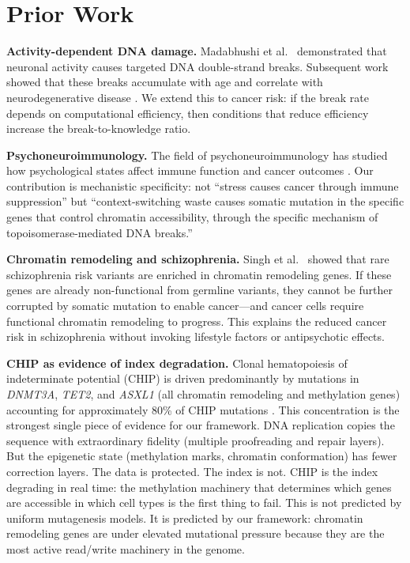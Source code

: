 \documentclass[11pt]{article}
\theoremstyle{definition}
\begin{document}
\section{Prior Work}
\label{sec:prior}

\textbf{Activity-dependent DNA damage.} Madabhushi et al.\
\cite{Madabhushi2015} demonstrated that neuronal activity causes
targeted DNA double-strand breaks. Subsequent work showed that
these breaks accumulate with age and correlate with
neurodegenerative disease \cite{Thadathil2021}. We extend this to
cancer risk: if the break rate depends on computational efficiency,
then conditions that reduce efficiency increase the break-to-knowledge
ratio.

\textbf{Psychoneuroimmunology.} The field of
psychoneuroimmunology has studied how psychological states
affect immune function and cancer outcomes \cite{Kiecolt-Glaser2002}.
Our contribution is mechanistic specificity: not ``stress causes
cancer through immune suppression'' but ``context-switching waste
causes somatic mutation in the specific genes that control chromatin
accessibility, through the specific mechanism of topoisomerase-mediated
DNA breaks.''

\textbf{Chromatin remodeling and schizophrenia.} Singh et al.\
\cite{Singh2016} showed that rare schizophrenia risk variants are
enriched in chromatin remodeling genes. If these genes are already
non-functional from germline variants, they cannot be further
corrupted by somatic mutation to enable cancer---and cancer cells
require functional chromatin remodeling to progress. This explains
the reduced cancer risk in schizophrenia without invoking
lifestyle factors or antipsychotic effects.

\textbf{CHIP as evidence of index degradation.}
Clonal hematopoiesis of indeterminate potential (CHIP) is
driven predominantly by mutations in \emph{DNMT3A}, \emph{TET2},
and \emph{ASXL1} (all chromatin remodeling and methylation genes)
accounting for approximately 80\% of CHIP mutations
\cite{Jaiswal2014, Steensma2015}. This concentration is the
strongest single piece of evidence for our framework. DNA
replication copies the sequence with extraordinary fidelity
(multiple proofreading and repair layers). But the epigenetic
state (methylation marks, chromatin conformation) has fewer
correction layers. The data is protected. The index is not.
CHIP is the index degrading in real time: the methylation
machinery that determines which genes are accessible in which
cell types is the first thing to fail. This is not predicted
by uniform mutagenesis models. It is predicted by our framework:
chromatin remodeling genes are under elevated mutational pressure
because they are the most active read/write machinery in the genome.
\end{document}
